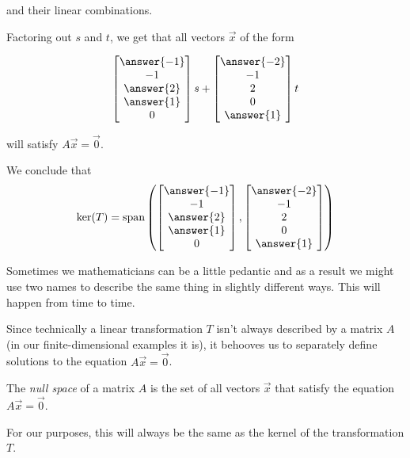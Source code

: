 \documentclass{ximera}
\begin{document}
\begin{example}
\begin{explanation}
and their linear combinations.

Factoring out $s$ and $t$, we get that all vectors $\vec{x}$ of the form

$$\begin{bmatrix}\answer{-1}\\-1\\\answer{2}\\\answer{1}\\0\end{bmatrix}s+\begin{bmatrix}\answer{-2}\\-1\\2\\0\\\answer{1}\end{bmatrix}t$$

will satisfy $A\vec{x}=\vec{0}$.
 
We conclude that
$$\mbox{ker}(T)=\mbox{span}\left(\begin{bmatrix}\answer{-1}\\-1\\\answer{2}\\\answer{1}\\0\end{bmatrix},\begin{bmatrix}\answer{-2}\\-1\\2\\0\\\answer{1}\end{bmatrix}\right)$$
\end{explanation}

\end{example}

Sometimes we mathematicians can be a little pedantic and as a result we might use two names to describe the same thing in slightly different ways. This will happen from time to time. 

Since technically a linear transformation $T$ isn't always described by a matrix $A$ (in our finite-dimensional examples it is), it behooves us to separately define solutions to the equation $A\vec{x}=\vec{0}$.

\begin{definition}
  The \emph{null space} of a matrix $A$ is the set of all vectors $\vec{x}$ that satisfy the equation $A\vec{x}=\vec{0}$.

  For our purposes, this will always be the same as the kernel of the transformation $T$.
\end{definition}
\end{document}
